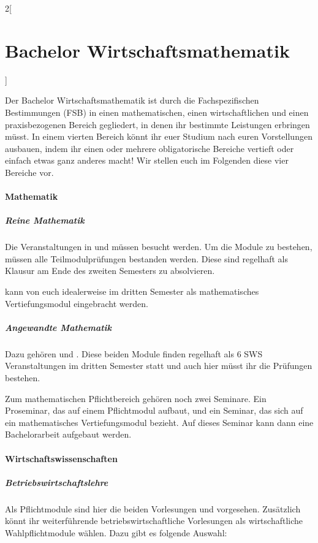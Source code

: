 \begin{multicols}{2}[\section{Bachelor Wirtschaftsmathematik}]

Der Bachelor Wirtschaftsmathematik ist durch die Fachspezifischen Bestimmungen
(FSB) in einen mathematischen, einen wirtschaftlichen und einen praxisbezogenen
Bereich gegliedert, in denen ihr bestimmte Leistungen erbringen müsst. In einem
vierten Bereich könnt ihr euer Studium nach euren Vorstellungen ausbauen, indem
ihr einen oder mehrere obligatorische Bereiche vertieft oder einfach etwas ganz
anderes macht! Wir stellen euch im Folgenden diese vier Bereiche vor.

\paragraph{Mathematik}

\subparagraph{Reine Mathematik}

Die Veranstaltungen in  und  müssen besucht werden. Um die Module zu
bestehen, müssen alle Teilmodulprüfungen bestanden werden. Diese sind regelhaft
als Klausur am Ende des zweiten Semesters zu absolvieren.

 kann von euch idealerweise im dritten Semester als
mathematisches Vertiefungsmodul eingebracht werden.

\subparagraph{Angewandte Mathematik}

Dazu gehören  und . Diese beiden Module finden regelhaft als 6 SWS Veranstaltungen im
dritten Semester statt und auch hier müsst ihr die Prüfungen bestehen.

Zum mathematischen Pflichtbereich gehören noch zwei Seminare. Ein Proseminar,
das auf einem Pflichtmodul aufbaut, und ein Seminar, das sich auf ein
mathematisches Vertiefungsmodul bezieht. Auf dieses Seminar kann dann eine
Bachelorarbeit aufgebaut werden.

\paragraph{Wirtschaftswissenschaften}

\subparagraph{Betriebswirtschaftslehre}

Als Pflichtmodule sind hier die beiden Vorlesungen  und
 vorgesehen.  Zusätzlich könnt ihr weiterführende
betriebswirtschaftliche Vorlesungen als wirtschaftliche Wahlpflichtmodule
wählen. Dazu gibt es folgende Auswahl:


\end{multicols}
